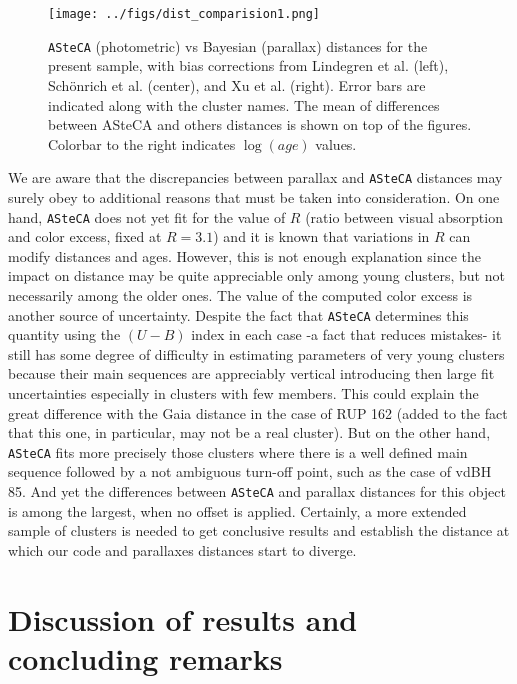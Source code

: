 \documentclass[draft]{aa}
\begin{document}
\begin{figure}[ht]
    \centering
    \texttt{[image: ../figs/dist\_comparision1.png]}
    \caption{\texttt{ASteCA} (photometric) vs Bayesian (parallax) distances for
    the present sample, with bias corrections from Lindegren et al. (left),
    Sch\"onrich et al. (center), and Xu et al. (right). Error bars are
    indicated along with the cluster names. The mean of differences between
    ASteCA and others distances is shown on top of the figures. Colorbar to
    the right indicates $\log(age)$ values.}
    \label{fig:prlxbias}
\end{figure}

We are aware that the discrepancies between parallax and \texttt{ASteCA}
distances may surely obey to additional reasons that must be taken into
consideration. On one hand, \texttt{ASteCA} does not yet fit for the value of
$R$ (ratio between visual absorption and color excess, fixed at $R=3.1$) and it
is known that variations in $R$ can modify distances and ages. However, this is
not enough explanation since the impact on distance may be quite appreciable
only among young clusters, but not necessarily among the older ones. The value
of the computed color excess is another source of uncertainty. 
Despite the fact that \texttt{ASteCA} determines this quantity using the
$(U-B)$ index in each case -a fact that reduces mistakes- it still has some
degree of difficulty in estimating parameters of very young clusters because
their main sequences are appreciably vertical introducing then large fit
uncertainties especially in clusters with few members. This could explain the
great difference with the Gaia distance in the case of RUP 162 (added to the
fact that this one, in particular, may not be a real cluster). But on the other
hand, \texttt{ASteCA} fits more precisely those clusters where there is a well
defined main sequence followed by a not ambiguous turn-off point, such as the
case of vdBH 85. And yet the differences between \texttt{ASteCA} and parallax
distances for this object is among the largest, when no offset is applied.
Certainly, a more extended sample of clusters is needed to get conclusive
results and establish the distance at which our code and parallaxes distances
start to diverge.





\section{Discussion of results and concluding remarks}
\label{sec:results_concl}
\end{document}
